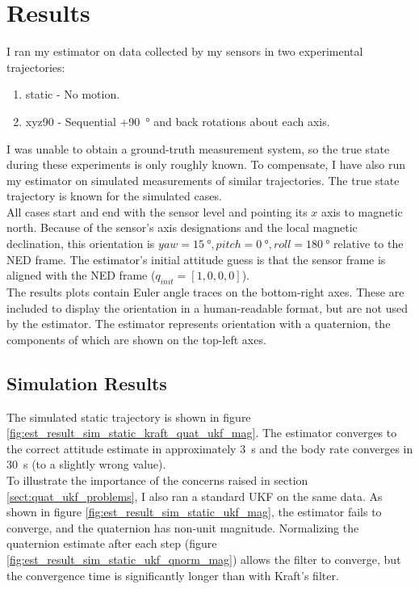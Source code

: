\documentclass[conference]{IEEEtran}
\begin{document}
\section{Results}
I ran my estimator on data collected by my sensors in two experimental trajectories:
\begin{enumerate}
    \item static - No motion.
    \item xyz90 - Sequential +\SI{90}{\degree} and back rotations about each axis.
\end{enumerate}
I was unable to obtain a ground-truth measurement system, so the true state during these experiments is only roughly known. To compensate, I have also run my estimator on simulated measurements of similar trajectories. The true state trajectory is known for the simulated cases.\\

All cases start and end with the sensor level and pointing its $x$ axis to magnetic north. Because of the sensor's axis designations and the local magnetic declination, this orientation is $yaw = \SI{15}{\degree}, pitch = \SI{0}{\degree}, roll = \SI{180}{\degree}$ relative to the NED frame. The estimator's initial attitude guess is that the sensor frame is aligned with the NED frame ($q_{init} = [1, 0, 0, 0]$).\\

The results plots contain Euler angle traces on the bottom-right axes. These are included to display the orientation in a human-readable format, but are not used by the estimator. The estimator represents orientation with a quaternion, the components of which are shown on the top-left axes.\\

\subsection{Simulation Results}
The simulated static trajectory is shown in figure \ref{fig:est_result_sim_static_kraft_quat_ukf_mag}. The estimator converges to the correct attitude estimate in approximately \SI{3}{\second} and the body rate converges in \SI{30}{\second} (to a slightly wrong value).\\

To illustrate the importance of the concerns raised in section \ref{sect:quat_ukf_problems}, I also ran a standard UKF on the same data. As shown in figure \ref{fig:est_result_sim_static_ukf_mag}, the estimator fails to converge, and the quaternion has non-unit magnitude. Normalizing the quaternion estimate after each step (figure \ref{fig:est_result_sim_static_ukf_qnorm_mag}) allows the filter to converge, but the convergence time is significantly longer than with Kraft's filter.\\
\end{document}
